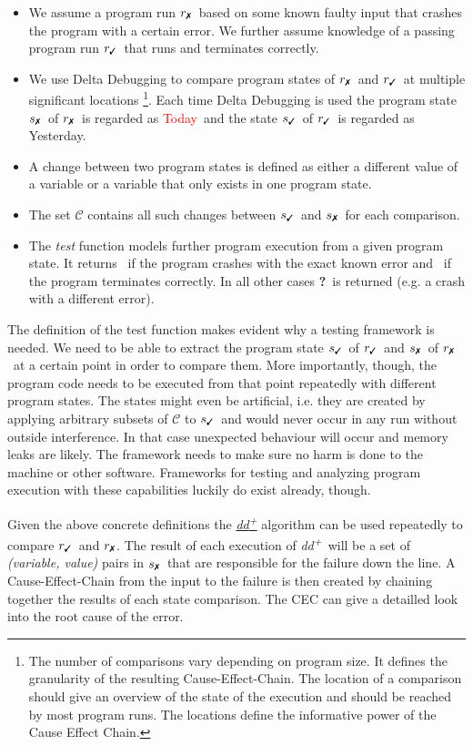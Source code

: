 \documentclass[a4paper,UKenglish]{lipics-v2018}
\newcommand{\ddp}{\textit{dd\textsuperscript{+}}}
\newcommand{\green}[1]{\textcolor{td-green}{#1}}
\newcommand{\red}[1]{\textcolor{red}{#1}}
\newcommand{\yd}[0]{\green{Yesterday}}
\newcommand{\td}[0]{\red{Today}}
\newcommand{\C}[0]{\ensuremath{\mathcal{C}}}
\newcommand{\cmark}{\text{\ding{51}}}
\newcommand{\xmark}{\text{\ding{55}}}
\newcommand{\qmark}{\textbf{?}}
\newcommand{\rpass}[0]{\ensuremath{r_{\cmark}}}
\newcommand{\rfail}[0]{\ensuremath{r_{\xmark}}}
\newcommand{\spass}[0]{\ensuremath{s_{\cmark}}}
\newcommand{\sfail}[0]{\ensuremath{s_{\xmark}}}
\begin{document}
\begin{itemize}
	\item We assume a program run \rfail\ based on some known faulty input that crashes the program with a certain error. We further assume knowledge of a passing program run \rpass\ that runs and terminates correctly.
	\item We use Delta Debugging to compare program states of \rfail\ and \rpass\ at multiple significant locations \footnote{The number of comparisons vary depending on program size. It defines the granularity of the resulting Cause-Effect-Chain. The location of a comparison should give an overview of the state of the execution and should be reached by most program runs. The locations define the informative power of the Cause Effect Chain.}. Each time Delta Debugging is used the program state \sfail\ of \rfail\ is regarded as \td\ and the state \spass\ of \rpass\ is regarded as \yd.
	\item A change between two program states is defined as either a different value of a variable or a variable that only exists in one program state.
	\item The set $\C$ contains all such changes between \spass\ and \sfail\ for each comparison.
	\item The \textit{test} function models further program execution from a given program state. It returns \xmark\ if the program crashes with the exact known error and \cmark\ if the program terminates correctly. In all other cases \qmark\ is returned (e.g. a crash with a different error). 
\end{itemize}

The definition of the test function makes evident why a testing framework is needed. We need to be able to extract the program state \spass\ of \rpass\ and \sfail\ of \rfail\ at a certain point in order to compare them. More importantly, though, the program code needs to be executed from that point repeatedly with different program states. The states might even be artificial, i.e. they are created by applying arbitrary subsets of $\C$ to \spass\ and would never occur in any run without outside interference. In that case unexpected behaviour will occur and memory leaks are likely. The framework needs to make sure no harm is done to the machine or other software. Frameworks for testing and analyzing program execution with these capabilities luckily do exist already, though.

Given the above concrete definitions the \href{fig:ddp}{\ddp} algorithm can be used repeatedly to compare \rpass\ and \rfail. The result of each execution of \ddp\ will be a set of \textit{(variable, value)} pairs in \sfail\ that are responsible for the failure down the line. A Cause-Effect-Chain from the input to the failure is then created by chaining together the results of each state comparison. The CEC can give a detailled look into the root cause of the error.\\
\end{document}
